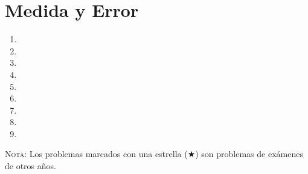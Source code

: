\documentclass[a4paper,titlepage]{article}
\begin{document}
\section{Medida y Error}
\begin{enumerate}[leftmargin=*,resume]
\item {}
\item {}
\item {}
\item {}
\item {}
\item {}
\item {}
\item {}
\item {}
\end{enumerate}

\vspace{2cm}

\textsc{Nota}: Los problemas marcados con una estrella ($\bigstar$) son problemas de
exámenes de otros años.
\end{document}
